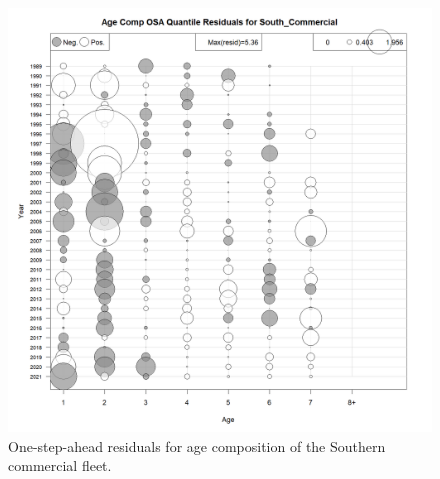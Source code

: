 \documentclass[
]{article}
\begin{document}
\begin{figure}

{\centering \includegraphics[width=1\linewidth]{../2023.RT.Runs/Run34/plots_png/diagnostics/Catch_age_comp_osa_resids_South_Commercial} 

}

\caption{One-step-ahead residuals for age composition of the Southern commercial fleet.}\label{fig:osa-South-comm-paa}
\end{figure}
\end{document}
